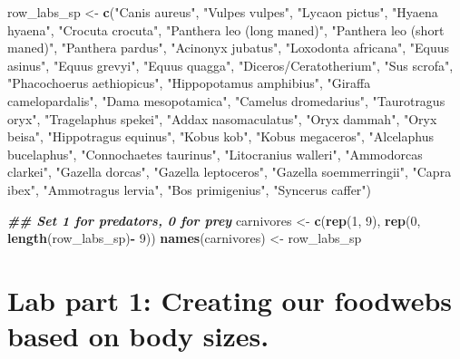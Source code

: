 \documentclass[
]{article}
\newenvironment{Shaded}{\begin{snugshade}}{\end{snugshade}}
\newcommand{\DecValTok}[1]{\textcolor[rgb]{0.00,0.00,0.81}{#1}}
\newcommand{\DocumentationTok}[1]{\textcolor[rgb]{0.56,0.35,0.01}{\textbf{\textit{#1}}}}
\newcommand{\FunctionTok}[1]{\textcolor[rgb]{0.13,0.29,0.53}{\textbf{#1}}}
\newcommand{\NormalTok}[1]{#1}
\newcommand{\OtherTok}[1]{\textcolor[rgb]{0.56,0.35,0.01}{#1}}
\newcommand{\SpecialCharTok}[1]{\textcolor[rgb]{0.81,0.36,0.00}{\textbf{#1}}}
\newcommand{\StringTok}[1]{\textcolor[rgb]{0.31,0.60,0.02}{#1}}
\begin{document}
\begin{Shaded}
\begin{Highlighting}[]
\NormalTok{row\_labs\_sp }\OtherTok{\textless{}{-}} \FunctionTok{c}\NormalTok{(}\StringTok{"Canis aureus"}\NormalTok{, }\StringTok{"Vulpes vulpes"}\NormalTok{, }\StringTok{"Lycaon pictus"}\NormalTok{, }\StringTok{"Hyaena hyaena"}\NormalTok{, }\StringTok{"Crocuta crocuta"}\NormalTok{, }\StringTok{"Panthera leo (long maned)"}\NormalTok{, }\StringTok{"Panthera leo (short maned)"}\NormalTok{, }\StringTok{"Panthera pardus"}\NormalTok{, }\StringTok{"Acinonyx jubatus"}\NormalTok{, }\StringTok{"Loxodonta africana"}\NormalTok{, }\StringTok{"Equus asinus"}\NormalTok{, }\StringTok{"Equus grevyi"}\NormalTok{, }\StringTok{"Equus quagga"}\NormalTok{, }\StringTok{"Diceros/Ceratotherium"}\NormalTok{, }\StringTok{"Sus scrofa"}\NormalTok{,  }\StringTok{"Phacochoerus aethiopicus"}\NormalTok{, }\StringTok{"Hippopotamus amphibius"}\NormalTok{, }\StringTok{"Giraffa camelopardalis"}\NormalTok{, }\StringTok{"Dama mesopotamica"}\NormalTok{, }\StringTok{"Camelus dromedarius"}\NormalTok{, }\StringTok{"Taurotragus oryx"}\NormalTok{, }\StringTok{"Tragelaphus spekei"}\NormalTok{, }\StringTok{"Addax nasomaculatus"}\NormalTok{, }\StringTok{"Oryx dammah"}\NormalTok{, }\StringTok{"Oryx beisa"}\NormalTok{, }\StringTok{"Hippotragus equinus"}\NormalTok{, }\StringTok{"Kobus kob"}\NormalTok{, }\StringTok{"Kobus megaceros"}\NormalTok{, }\StringTok{"Alcelaphus bucelaphus"}\NormalTok{, }\StringTok{"Connochaetes taurinus"}\NormalTok{, }\StringTok{"Litocranius walleri"}\NormalTok{, }\StringTok{"Ammodorcas clarkei"}\NormalTok{, }\StringTok{"Gazella dorcas"}\NormalTok{, }\StringTok{"Gazella leptoceros"}\NormalTok{, }\StringTok{"Gazella soemmerringii"}\NormalTok{, }\StringTok{"Capra ibex"}\NormalTok{, }\StringTok{"Ammotragus lervia"}\NormalTok{, }\StringTok{"Bos primigenius"}\NormalTok{, }\StringTok{"Syncerus caffer"}\NormalTok{)}

\DocumentationTok{\#\# Set 1 for predators, 0 for prey  }
\NormalTok{carnivores }\OtherTok{\textless{}{-}} \FunctionTok{c}\NormalTok{(}\FunctionTok{rep}\NormalTok{(}\DecValTok{1}\NormalTok{, }\DecValTok{9}\NormalTok{), }\FunctionTok{rep}\NormalTok{(}\DecValTok{0}\NormalTok{, }\FunctionTok{length}\NormalTok{(row\_labs\_sp)}\SpecialCharTok{{-}} \DecValTok{9}\NormalTok{))}
\FunctionTok{names}\NormalTok{(carnivores) }\OtherTok{\textless{}{-}}\NormalTok{ row\_labs\_sp}
\end{Highlighting}
\end{Shaded}

\section{Lab part 1: Creating our foodwebs based on body
sizes.}\label{lab-part-1-creating-our-foodwebs-based-on-body-sizes.}
\end{document}
